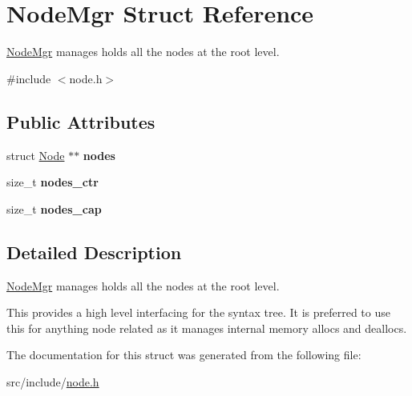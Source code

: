 \hypertarget{struct_node_mgr}{}\section{Node\+Mgr Struct Reference}
\label{struct_node_mgr}


\mbox{\hyperlink{struct_node_mgr}{Node\+Mgr}} manages holds all the nodes at the root level.  




{\ttfamily \#include $<$node.\+h$>$}

\subsection*{Public Attributes}
\begin{DoxyCompactItemize}
\item 
\mbox{\label{struct_node_mgr_a14d0d825168ce49b403d3f780751b4bd}} 
struct \mbox{\hyperlink{struct_node}{Node}} $\ast$$\ast$ {\bfseries nodes}
\item 
\mbox{\label{struct_node_mgr_a2be1be7c4f3c0b6aa1bd82aae15a5df6}} 
size\+\_\+t {\bfseries nodes\+\_\+ctr}
\item 
\mbox{\label{struct_node_mgr_a6afaf081b697ff8e8f8a670804fa9d7c}} 
size\+\_\+t {\bfseries nodes\+\_\+cap}
\end{DoxyCompactItemize}


\subsection{Detailed Description}
\mbox{\hyperlink{struct_node_mgr}{Node\+Mgr}} manages holds all the nodes at the root level. 

This provides a high level interfacing for the syntax tree. It is preferred to use this for anything node related as it manages internal memory allocs and deallocs. 

The documentation for this struct was generated from the following file\+:\begin{DoxyCompactItemize}
\item 
src/include/\mbox{\hyperlink{node_8h}{node.\+h}}\end{DoxyCompactItemize}
